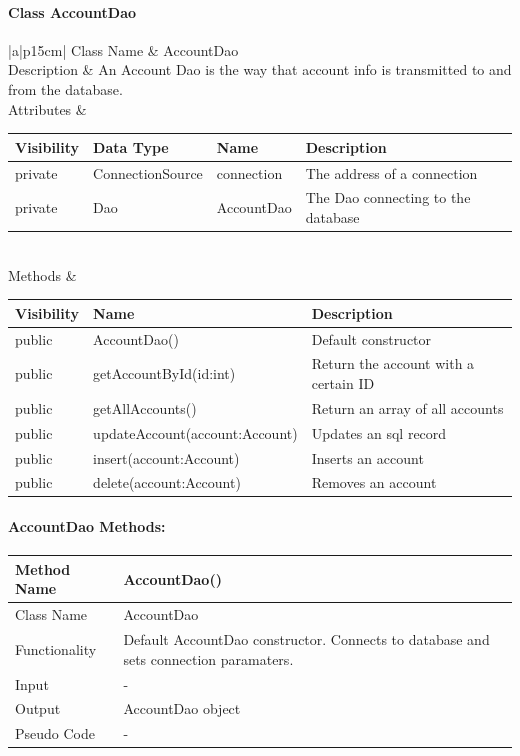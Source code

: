 \documentclass[12pt]{article}
\begin{document}
\paragraph{Class AccountDao}
\begin{table}
	\begin{tabular}{|a|p{15cm}|}
		\hline
		{Class Name} & {AccountDao} \\
		\hline
		Description & An Account Dao is the way that account info is transmitted to and from the database. \\
		\hline
		Attributes & 
		\begin{tabular}{| p{2cm} | p{4.0cm} | p{3.0cm} | p{4.45cm} |}
			\hline
			\rowcolor{lightgray}
			Visibility & Data Type & Name & Description \\
			\hline
			\rowcolor{white}
			private & ConnectionSource & connection & The address of a connection \\
			\hline
			private & Dao & AccountDao & The Dao connecting to the database \\
			\hline
		\end{tabular} \\
		\hline
		Methods & 		 
		\begin{tabular}{| p{2cm} | p{6cm} | p{5.9cm} |}
			\hline
			\rowcolor{gray}
			{Visibility} &{Name} & {Description} \\
			\hline
			\rowcolor{white}			
			public & AccountDao() & Default constructor\\
			\hline
			public &  getAccountById(id:int) & Return the account with a certain ID\\
			\hline
			public &  getAllAccounts() & Return an array of all accounts\\
			\hline
			public &  updateAccount(account:Account)& Updates an sql record\\
			\hline
			public &  insert(account:Account) &  Inserts an account\\
			\hline
			public &  delete(account:Account) & Removes an account\\
			\hline		
		\end{tabular}								 
	\end{tabular}
\end{table}

\paragraph{AccountDao Methods:}

\begin{tabular}{ |p{3cm}||p{\colWidth}|  }
	\hline
	Method Name &  AccountDao()\\
	\hline
	Class Name & AccountDao\\
	\hline
	Functionality & Default AccountDao constructor. Connects to database and sets connection paramaters.\\
	\hline
	Input & -\\
	\hline
	Output & AccountDao object\\
	\hline
	Pseudo Code & -\\
	\hline
\end{tabular}    
\end{document}
